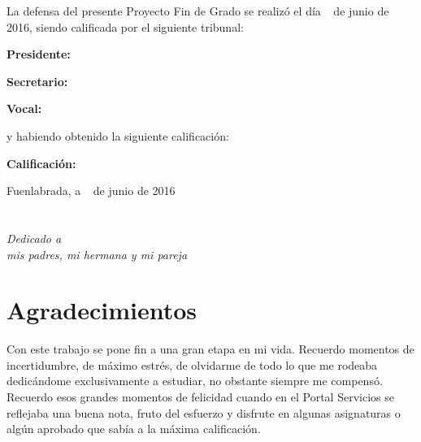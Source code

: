 \documentclass[a4paper, 12pt]{book}
\begin{document}
\vspace{1cm}
La defensa del presente Proyecto Fin de Grado se realizó el día \qquad$\;\,$ de junio de 2016, siendo calificada por el siguiente tribunal:


\vspace{0.5cm}
\textbf{Presidente:}

\vspace{1.2cm}
\textbf{Secretario:}

\vspace{1.2cm}
\textbf{Vocal:}


\vspace{1.2cm}
y habiendo obtenido la siguiente calificación:

\vspace{1cm}
\textbf{Calificación:}


\vspace{1cm}
\begin{flushright}
Fuenlabrada, a \qquad$\;\,$ de junio de 2016
\end{flushright}

\setlength{\parskip}{2mm}

\chapter*{}
\begin{flushright}
\textit{Dedicado a \\
mis padres, mi hermana y mi pareja}
\end{flushright}


\chapter*{Agradecimientos}

Con este trabajo se pone fin a una gran etapa en mi vida. Recuerdo momentos de incertidumbre, de máximo estrés, de olvidarme de todo lo que me rodeaba dedicándome exclusivamente a estudiar, no obstante siempre me compensó. Recuerdo esos grandes momentos de felicidad cuando en el Portal Servicios se reflejaba una buena nota, fruto del esfuerzo y disfrute en algunas asignaturas o algún aprobado que sabía a la máxima calificación.
\end{document}
